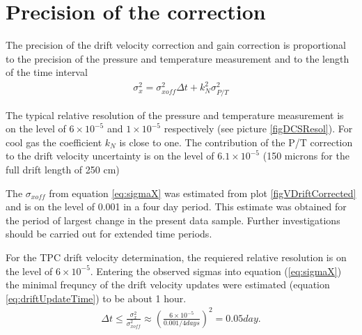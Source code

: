 \documentclass{elsart}
\begin{document}
\section{Precision of the correction}

The precision of the drift velocity correction and gain correction is proportional
to the  precision of the pressure and temperature measurement and to the length of the time
interval 
\begin{eqnarray}
    \sigma^2_x=\sigma^2_{xoff}\Delta{t}+k^2_N\sigma^2_{P/T}
\label{eq:sigmaX}
\end{eqnarray}

The typical relative resolution of the pressure and temperature measurement is on the level of $6\times10^{-5}$ and
$1\times10^{-5}$ respectively (see picture \ref{figDCSResol}). For cool gas the  coefficient $k_N$ is close to one. The contribution of the P/T correction to the drift velocity uncertainty is on the level of  $6.1\times10^{-5}$ (150 microns for the full drift length of 250 cm)

The $\sigma_{xoff}$ from equation \ref{eq:sigmaX} was  estimated from plot \ref{figVDriftCorrected} and is on the level of 0.001 in a four day period. This estimate was obtained for the period of largest change in the present data sample. Further investigations should be carried out for extended time periods.

For the TPC drift velocity determination, the requiered relative resolution is on the level of $6\times10^{-5}$.
Entering the observed sigmas into equation (\ref{eq:sigmaX}) the minimal frequncy of the drift velocity updates were estimated (equation \ref{eq:driftUpdateTime}) to be about 1 hour.  
\begin{eqnarray}
    \Delta{t}\le\frac{\sigma^2_x}{\sigma^2_{xoff}}\approx\left(\frac{6\times10^{-5}}{0.001/4days}\right)^2=0.05 day.
\label{eq:driftUpdateTime}
\end{eqnarray}
\end{document}

